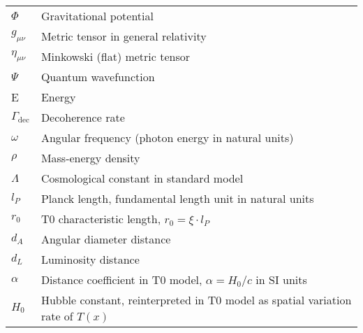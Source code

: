 \documentclass[12pt,a4paper]{article}
\newcommand{\Tfield}{T(x)}
\begin{document}
\begin{table}[h]
{\begin{tabular}{p{}p{}}
				$\Phi$ & Gravitational potential \\
				$g_{\mu\nu}$ & Metric tensor in general relativity \\
				$\eta_{\mu\nu}$ & Minkowski (flat) metric tensor \\
				$\Psi$ & Quantum wavefunction \\
				E & Energy \\
				$\Gamma_{\text{dec}}$ & Decoherence rate \\
				$\omega$ & Angular frequency (photon energy in natural units) \\
				$\rho$ & Mass-energy density \\
				$\Lambda$ & Cosmological constant in standard model \\
				$l_P$ & Planck length, fundamental length unit in natural units \\
				$r_0$ & T0 characteristic length, $r_0 = \xi \cdot l_P$ \\
				$d_A$ & Angular diameter distance \\
				$d_L$ & Luminosity distance \\
				$\alpha$ & Distance coefficient in T0 model, $\alpha = H_0/c$ in SI units \\
				$H_0$ & Hubble constant, reinterpreted in T0 model as spatial variation rate of $\Tfield$ \\
				\bottomrule
			\end{tabular}
		}
	\end{table}
	
\end{document}
